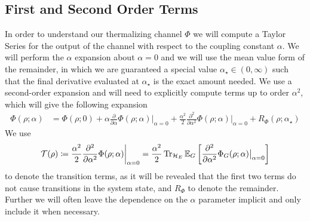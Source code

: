 \subsection{First and Second Order Terms}
In order to understand our thermalizing channel $\Phi$ we will compute a Taylor Series for the output of the channel with respect to the coupling constant $\alpha$. We will perform the $\alpha$ expansion about $\alpha = 0$ and we will use the mean value form of the remainder, in which we are guaranteed a special value $\alpha_{\star} \in (0, \infty)$ such that the final derivative evaluated at $\alpha_{\star}$ is the exact amount needed. We use a second-order expansion and will need to explicitly compute terms up to order $\alpha^2$, which will give the following expansion
\begin{align}
    \Phi(\rho; \alpha) &= \Phi(\rho; 0) + \alpha \frac{\partial}{\partial \alpha} \Phi(\rho; \alpha) \big|_{\alpha = 0} + \frac{\alpha^2}{2} \frac{\partial^2}{\partial \alpha^2} \Phi(\rho; \alpha) \big|_{\alpha = 0} + R_{\Phi}(\rho; \alpha_{\star}) \label{eq:phi_taylor_series}
\end{align}
We use
\begin{equation}
    \mathcal{T}(\rho) \coloneqq \frac{\alpha^2}{2} \frac{\partial^2}{\partial \alpha^2} \Phi(\rho; \alpha) \bigg|_{\alpha = 0} = \frac{\alpha^2}{2}  \Tr_{\mathcal{H}_E} \mathbb{E}_{G} \left[\frac{\partial^2}{\partial \alpha^2} \Phi_G(\rho; \alpha) \big|_{\alpha = 0}\right] \label{eq:transition_def}
\end{equation} to denote the transition terms, as it will be revealed that the first two terms do not cause transitions in the system state, and $R_{\Phi}$ to denote the remainder. 
Further we will often leave the dependence on the  $\alpha$ parameter implicit and only include it when necessary.


